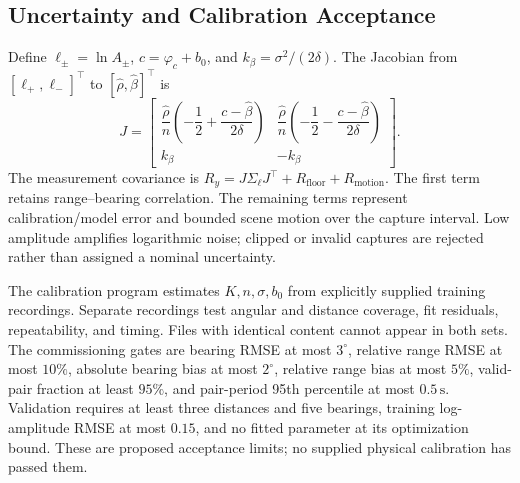 \subsection{Uncertainty and Calibration Acceptance}
Define $\ell_\pm=\ln A_\pm$, $c=\varphi_c+b_0$, and $k_\beta=\sigma^2/(2\delta)$. The Jacobian from $[\ell_+,\ell_-]^\top$ to $[\hat\rho,\hat\beta]^\top$ is
\begin{equation}
J=\begin{bmatrix}
\dfrac{\hat\rho}{n}\left(-\dfrac12+\dfrac{c-\hat\beta}{2\delta}\right)&
\dfrac{\hat\rho}{n}\left(-\dfrac12-\dfrac{c-\hat\beta}{2\delta}\right)\\[4pt]
k_\beta&-k_\beta
\end{bmatrix}.
\label{eq:covjac}
\end{equation}
The measurement covariance is $R_y=J\Sigma_\ell J^\top+R_{\mathrm{floor}}+R_{\mathrm{motion}}$. The first term retains range--bearing correlation. The remaining terms represent calibration/model error and bounded scene motion over the capture interval. Low amplitude amplifies logarithmic noise; clipped or invalid captures are rejected rather than assigned a nominal uncertainty.

The calibration program estimates $K,n,\sigma,b_0$ from explicitly supplied training recordings. Separate recordings test angular and distance coverage, fit residuals, repeatability, and timing. Files with identical content cannot appear in both sets. The commissioning gates are bearing RMSE at most $3^\circ$, relative range RMSE at most $10\%$, absolute bearing bias at most $2^\circ$, relative range bias at most $5\%$, valid-pair fraction at least $95\%$, and pair-period 95th percentile at most $0.5\,\mathrm{s}$. Validation requires at least three distances and five bearings, training log-amplitude RMSE at most $0.15$, and no fitted parameter at its optimization bound. These are proposed acceptance limits; no supplied physical calibration has passed them.



